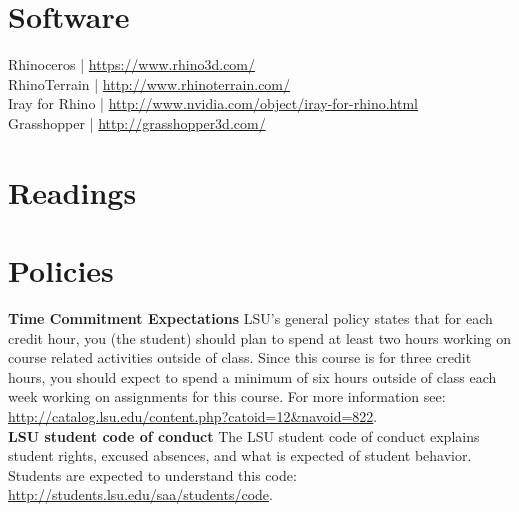 \documentclass[11pt,article,oneside]{memoir}
\begin{document}
\section{Software}
Rhinoceros | \url{https://www.rhino3d.com/}\\
RhinoTerrain | \url{http://www.rhinoterrain.com/}\\
Iray for Rhino | \url{http://www.nvidia.com/object/iray-for-rhino.html}\\
Grasshopper | \url{http://grasshopper3d.com/}\\


\section{Readings}
\renewcommand*{\bibfont}{\normalsize} %
\vspace*{0.5cm}
\nocite{*}
\setlength{}
\printbibliography[heading=none]

\clearpage

\section{Policies}

\noindent \textbf{Time Commitment Expectations}
LSU's general policy states that for each credit hour, you (the student) should plan to
spend at least two hours working on course related activities outside of class. Since this course is for three credit hours, you should expect to spend a minimum of six hours outside of class each week working on assignments for this course. For more information see: 
\url{http://catalog.lsu.edu/content.php?catoid=12&navoid=822}.\\

\noindent \textbf{LSU student code of conduct}
The LSU student code of conduct explains student rights, excused absences, and what is expected of student behavior. Students are expected to understand this code:  \url{http://students.lsu.edu/saa/students/code}.\\ %
\end{document}
